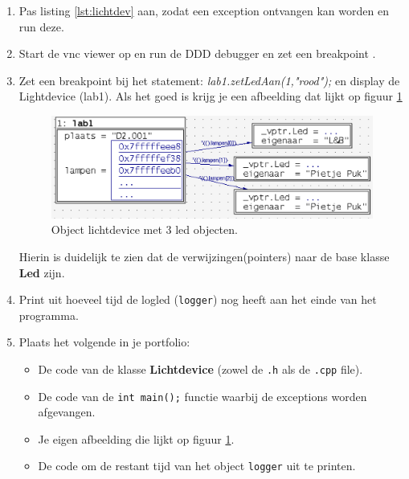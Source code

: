 \begin{enumerate}
	\item Pas listing  \ref{lst:lichtdev} aan, zodat een exception ontvangen kan worden en run deze.
	\item Start de vnc viewer op en run de DDD debugger en zet een breakpoint .
	\item Zet een breakpoint bij het statement: \textit{lab1.zetLedAan(1,"rood");} en display de Lightdevice (lab1).
	 Als het goed is krijg je een afbeelding dat lijkt op figuur \ref{fig:dddmld}
\begin{figure}[h!]
	\captionsetup{justification=centering}
	\includegraphics[width=0.95 \linewidth]{figuren/dddmeerdreld}     
	\centering
	\caption{Object lichtdevice met 3 led objecten.}
	\label{fig:dddmld}
\end{figure}
Hierin is duidelijk te zien dat de verwijzingen(pointers) naar de base klasse \textbf{Led} zijn.
\item Print uit hoeveel tijd de logled (\texttt{logger}) nog heeft aan het einde van het programma.
\item Plaats het volgende in je portfolio:
\begin{itemize} 
\item De code van de klasse \textbf{Lichtdevice} (zowel de \texttt{.h} als de \texttt{.cpp} file).
\item De code van de  \texttt{int main();} functie waarbij de exceptions worden afgevangen.  
\item Je eigen afbeelding die lijkt op figuur \ref{fig:dddmld}.
\item De code om de restant tijd van het object \texttt{logger} uit te printen. 
\end{itemize}	
	
\end{enumerate}